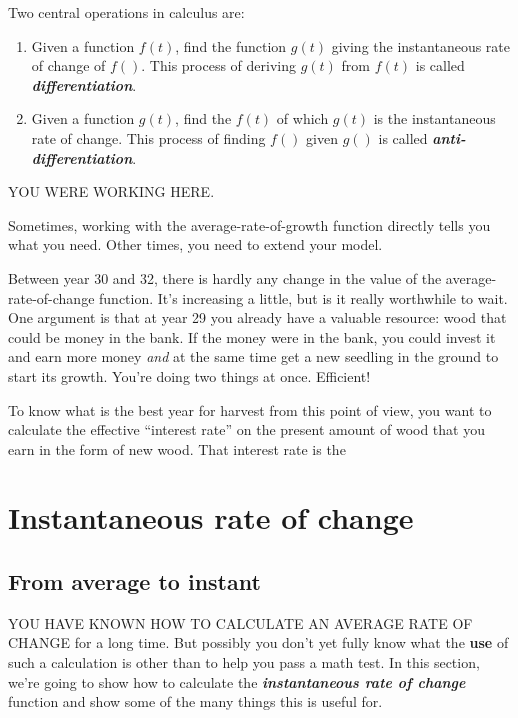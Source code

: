\documentclass[
]{book}
\providecommand{\tightlist}{%
  \setlength{\itemsep}{0pt}\setlength{\parskip}{0pt}}
\begin{document}
Two central operations in calculus are:

\begin{enumerate}
\def\labelenumi{\arabic{enumi}.}
\tightlist
\item
  Given a function \(f(t)\), find the function \(g(t)\) giving the instantaneous rate of change of \(f()\). This process of deriving \(g(t)\) from \(f(t)\) is called \textbf{\emph{differentiation}}.
\item
  Given a function \(g(t)\), find the \(f(t)\) of which \(g(t)\) is the instantaneous rate of change. This process of finding \(f()\) given \(g()\) is called \textbf{\emph{anti-differentiation}}.
\end{enumerate}

YOU WERE WORKING HERE.

Sometimes, working with the average-rate-of-growth function directly tells you what you need. Other times, you need to extend your model.

Between year 30 and 32, there is hardly any change in the value of the average-rate-of-change function. It's increasing a little, but is it really worthwhile to wait. One argument is that at year 29 you already have a valuable resource: wood that could be money in the bank. If the money were in the bank, you could invest it and earn more money \emph{and} at the same time get a new seedling in the ground to start its growth. You're doing two things at once. Efficient!

To know what is the best year for harvest from this point of view, you want to calculate the effective ``interest rate'' on the present amount of wood that you earn in the form of new wood. That interest rate is the

\hypertarget{instantaneous-rate-of-change-1}{%
\chapter{Instantaneous rate of change}\label{instantaneous-rate-of-change-1}}

\hypertarget{from-average-to-instant}{%
\section{From average to instant}\label{from-average-to-instant}}

YOU HAVE KNOWN HOW TO CALCULATE AN AVERAGE RATE OF CHANGE for a long time. But possibly you don't yet fully know what the \textbf{use} of such a calculation is other than to help you pass a math test. In this section, we're going to show how to calculate the \textbf{\emph{instantaneous rate of change}} function and show some of the many things this is useful for.
\end{document}
